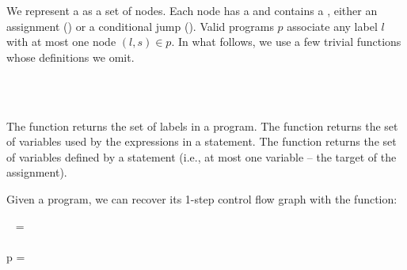 \noindent
We represent a  as a set of nodes. Each node has a
 and contains a , either an assignment
() or a conditional jump (). Valid programs $p$ associate
any label $l$ with at most one node $(l,s) \in p$. In what follows, we use a few
trivial functions whose definitions we omit. 

\begin{code}
   \isa {} \to {}\\
   \isa \iso{} \to {}\\
   \isa \iso{} \to {}
\end{code}

\noindent
The  function returns the set of labels in a program.
The  function returns the set of variables used by the expressions in
a statement. The  function returns the set of variables defined by
a statement (i.e., at most one variable -- the target of the assignment).

Given a program, we can recover its 1-step control flow graph with the
 function:

\begin{code}
  ~ = \\
   \isa {} \to {}\\
   \<\mvar p =
  \\
  \\
  \\
\end{code}

